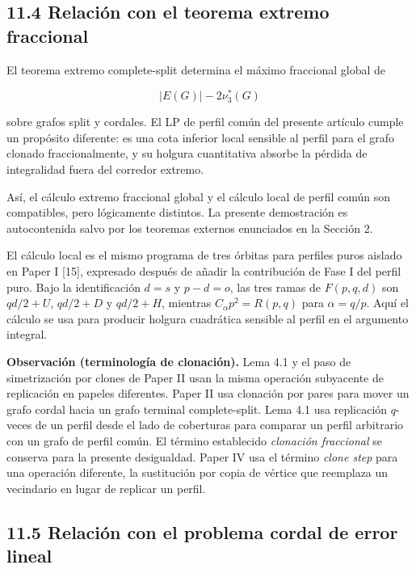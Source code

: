 \documentclass[spanish,11pt,a4paper]{article}
\begin{document}
\subsection{11.4 Relación con el teorema extremo
fraccional}\label{relaciuxf3n-con-el-teorema-extremo-fraccional}

El teorema extremo complete-split determina el máximo fraccional global
de

\[
|E(G)|-2\nu_3^*(G)
\]

sobre grafos split y cordales. El LP de perfil común del presente
artículo cumple un propósito diferente: es una cota inferior local
sensible al perfil para el grafo clonado fraccionalmente, y su holgura
cuantitativa absorbe la pérdida de integralidad fuera del corredor
extremo.

Así, el cálculo extremo fraccional global y el cálculo local de perfil
común son compatibles, pero lógicamente distintos. La presente
demostración es autocontenida salvo por los teoremas externos enunciados
en la Sección 2.

El cálculo local es el mismo programa de tres órbitas para perfiles
puros aislado en Paper I {[}15{]}, expresado después de añadir la
contribución de Fase I del perfil puro. Bajo la identificación \(d=s\) y
\(p-d=o\), las tres ramas de \(F(p,q,d)\) son \(qd/2+U\), \(qd/2+D\) y
\(qd/2+H\), mientras \(C_\alpha p^2=R(p,q)\) para \(\alpha=q/p\). Aquí
el cálculo se usa para producir holgura cuadrática sensible al perfil en
el argumento integral.

\textbf{Observación (terminología de clonación).} Lema 4.1 y el paso de
simetrización por clones de Paper II usan la misma operación subyacente
de replicación en papeles diferentes. Paper II usa clonación por pares
para mover un grafo cordal hacia un grafo terminal complete-split. Lema
4.1 usa replicación \(q\)-veces de un perfil desde el lado de coberturas
para comparar un perfil arbitrario con un grafo de perfil común. El
término establecido \emph{clonación fraccional} se conserva para la
presente desigualdad. Paper IV usa el término \emph{clone step} para una
operación diferente, la sustitución por copia de vértice que reemplaza
un vecindario en lugar de replicar un perfil.

\subsection{11.5 Relación con el problema cordal de error
lineal}\label{relaciuxf3n-con-el-problema-cordal-de-error-lineal}
\end{document}
